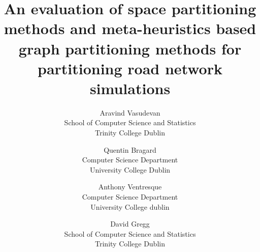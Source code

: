 \documentclass{wscpaperproc}
\theoremstyle{wsc}
\begin{document}
%
%

\title{An evaluation of space partitioning methods and meta-heuristics based graph partitioning methods for partitioning road network simulations}

\author{Aravind Vasudevan\\ [12pt]
School of Computer Science and Statistics\\
Trinity College Dublin\\
\and
Quentin Bragard\\ [12pt]
Computer Science Department\\
University College Dublin\\
\and
Anthony Ventresque\\ [12pt]
Computer Science Department\\
University College dublin\\
\and
David Gregg\\ [12pt]
School of Computer Science and Statistics\\
Trinity College Dublin
}
\end{document}
